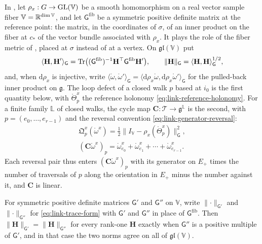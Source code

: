 In , let $\rho_x:G\to\mathrm{GL}(\mathbb V)$ be a smooth homomorphism on a real
vector sample fiber $\mathbb V=\mathbb R^{\dim\mathbb V}$, and let $\mathsf G^{\mathrm{fib}}$ be a symmetric
positive definite matrix at the reference point: the matrix, in the coordinates of $\sigma$, of an inner
product on the fiber at $c_*$ of the vector bundle associated with $\rho_x$. It plays the role of the
fiber metric of , placed at $\sigma$ instead of at a vertex. On
$\mathfrak{gl}(\mathbb V)$ put
\begin{equation}
\langle\mathbf H,\mathbf H'\rangle_{\mathsf G}=\operatorname{Tr}\bigl((\mathsf G^{\mathrm{fib}})^{-1}\mathbf H^\top\mathsf G^{\mathrm{fib}}\mathbf H'\bigr),
\qquad
\lVert\mathbf H\rVert_{\mathsf G}=\langle\mathbf H,\mathbf H\rangle_{\mathsf G}^{1/2},
\label{eq:link-trace-form}
\end{equation}
and, when $\mathrm d\rho_x$ is injective, write
$\langle\mathring\omega,\mathring\omega'\rangle_{\mathsf G}=\langle\mathrm d\rho_x\mathring\omega,\mathrm d\rho_x\mathring\omega'\rangle_{\mathsf G}$
for the pulled-back inner product on $\mathfrak g$. The loop defect of a closed walk $p$ based at $i_0$
is the first quantity below, with $\mathring\Theta^x_p$ the reference holonomy
\cref{eq:link-reference-holonomy}. For a finite family $\mathbb L$ of closed walks, the cycle map
$\mathbf C:\mathscr T\to\mathfrak g^{\mathbb L}$ is the second, with $p=(e_0,\ldots,e_{r-1})$ and the
reversal convention \cref{eq:link-generator-reversal}:
\begin{gather}
\mathfrak Q^x_p(\mathring\omega^x)=\tfrac12\bigl\lVert I_{\mathbb V}-\rho_x(\mathring\Theta^x_p)\bigr\rVert_{\mathsf G}^2,
\label{eq:link-loop-defect}\\
(\mathbf C\mathring\omega^x)_p=\mathring\omega^x_{e_0}+\mathring\omega^x_{e_1}+\cdots+\mathring\omega^x_{e_{r-1}}.
\label{eq:link-cycle-map}
\end{gather}
Each reversal pair thus enters $(\mathbf C\mathring\omega^x)_p$ with its generator on $E_+$ times the
number of traversals of $p$ along the orientation in $E_+$ minus the number against it, and $\mathbf C$
is linear.

For symmetric positive definite matrices $\mathsf G'$ and $\mathsf G''$ on $\mathbb V$, write
$\lVert\cdot\rVert_{\mathsf G'}$ and $\lVert\cdot\rVert_{\mathsf G''}$ for \cref{eq:link-trace-form} with
$\mathsf G'$ and $\mathsf G''$ in place of $\mathsf G^{\mathrm{fib}}$. Then
$\lVert\mathbf H\rVert_{\mathsf G'}=\lVert\mathbf H\rVert_{\mathsf G''}$ for every rank-one $\mathbf H$ exactly
when $\mathsf G''$ is a positive multiple of $\mathsf G'$, and in that case the two norms agree on all of
$\mathfrak{gl}(\mathbb V)$. 

